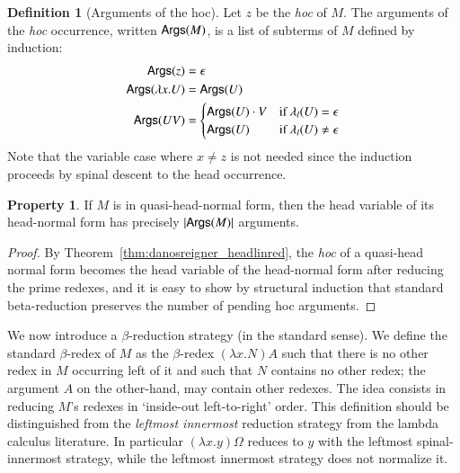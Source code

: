 \documentclass{elsarticle}
\theoremstyle{plain}
\theoremstyle{definition}
\newtheorem{definition}{Definition}[section]
\newtheorem{property}{Property}[section]
\theoremstyle{remark}
\begin{document}
\begin{definition}[Arguments of the hoc]
Let $z$ be the \emph{hoc} of $M$. The arguments of the \emph{hoc} occurrence, written ${\sf Args}(M)$, is a list of subterms of $M$ defined by induction:
\begin{align*}
{\sf Args}(z) &= \epsilon \\
{\sf Args}(\lambda x . U ) &= {\sf Args}(U) \\
{\sf Args}(U V) &= \begin{cases}
             {\sf Args}(U) \cdot V & \mbox{if } \lambda_l(U) = \epsilon\\
             {\sf Args}(U)         & \mbox{if } \lambda_l(U) \neq \epsilon
            \end{cases}
\end{align*}
Note that the variable case where $x\neq z$ is not needed since the induction proceeds by spinal descent to the head occurrence.
\end{definition}

\begin{property}
\label{property:hoc_argument_count_in_headnf}
    If $M$ is in quasi-head-normal form, then the head variable of its head-normal form has precisely $|{\sf Args}(M)|$ arguments.
\end{property}
\begin{proof}
By Theorem~\ref{thm:danosreigner_headlinred}, the \emph{hoc} of a quasi-head normal form becomes the head variable of the head-normal form after reducing the prime redexes, and it is easy to show by structural induction that standard beta-reduction preserves the number of pending hoc arguments.
\end{proof}

We now introduce a $\beta$-reduction strategy (in the standard sense).
We define the  standard $\beta$-redex of $M$ as the $\beta$-redex $(\lambda x . N) A$ such that there is no other redex in $M$ occurring left of it and such that $N$ contains no other redex; the argument $A$ on the other-hand, may contain other redexes.
The idea consists in reducing $M$'s redexes in `inside-out left-to-right' order.
This definition should be distinguished from the \emph{leftmost innermost} reduction strategy from the lambda calculus literature.
In particular $(\lambda x . y) \Omega$ reduces to $y$ with the leftmost spinal-innermost strategy, while the leftmost innermost strategy does not normalize it.
\end{document}
